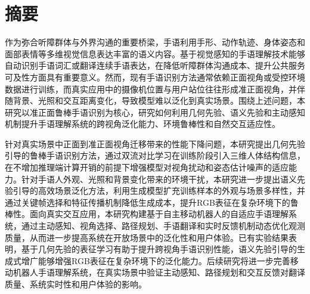 \maketitle%

\intobmk\chapter*{摘要}

作为弥合听障群体与外界沟通的重要桥梁，手语利用手形、动作轨迹、身体姿态和面部表情等多维视觉信息表达丰富的语义内容。基于视觉感知的手语理解技术能够自动识别手语词汇或翻译连续手语表达，在降低听障群体沟通成本、提升公共服务可及性方面具有重要意义。然而，现有手语识别方法通常依赖正面视角或受控环境数据进行训练，而真实应用中的摄像机位置与用户站位往往形成准正面视角，并伴随背景、光照和交互距离变化，导致模型难以泛化到真实场景。围绕上述问题，本研究以准正面鲁棒手语识别为核心，研究如何利用几何先验、语义先验和主动感知机制提升手语理解系统的跨视角泛化能力、环境鲁棒性和自然交互适应性。

针对真实场景中正面到准正面视角迁移带来的性能下降问题，本研究提出几何先验引导的鲁棒手语识别方法，通过双流对比学习在训练阶段引入三维人体结构信息，在不增加推理端计算开销的前提下增强模型对视角扰动和姿态估计噪声的适应能力。针对手语人外观、光照和背景变化带来的环境干扰，本研究进一步提出语义先验引导的高效场景泛化方法，利用生成模型扩充训练样本的外观与场景多样性，并通过关键帧选择和特征传播机制降低生成成本，提升RGB表征在复杂环境下的鲁棒性。面向真实交互应用，本研究构建基于自主移动机器人的自适应手语理解系统，通过主动感知、视角选择、路径规划、手语翻译和实时反馈机制动态优化观测质量，从而进一步提高系统在开放场景中的泛化性和用户体验。已有实验结果表明，基于几何先验的表征学习有助于提升跨视角手语识别性能，语义先验引导的生成式增广能够增强RGB表征在复杂环境下的泛化能力。后续研究将进一步完善移动机器人手语理解系统，在真实场景中验证主动感知、路径规划和交互反馈对翻译质量、系统实时性和用户体验的影响。


